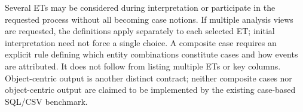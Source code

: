 Several ETs may be considered during interpretation or participate in the requested process without all becoming case notions. If multiple analysis views are requested, the definitions apply separately to each selected ET; initial interpretation need not force a single choice. A composite case requires an explicit rule defining which entity combinations constitute cases and how events are attributed. It does not follow from listing multiple ETs or key columns. Object-centric output is another distinct contract; neither composite cases nor object-centric output are claimed to be implemented by the existing case-based SQL/CSV benchmark.
